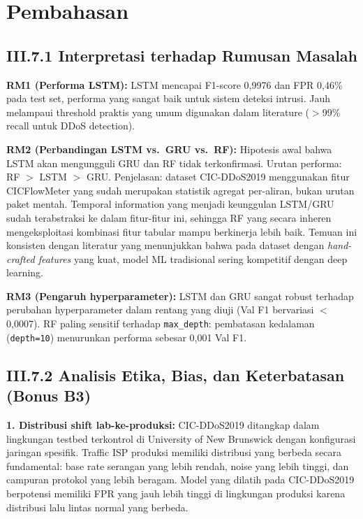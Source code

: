 \documentclass[11pt,a4paper,oneside]{report}
\begin{document}
\section{Pembahasan}

\subsection*{III.7.1 Interpretasi terhadap Rumusan Masalah}

\textbf{RM1 (Performa LSTM):} LSTM mencapai F1-score 0,9976 dan FPR 0,46\% pada test set, performa yang sangat baik untuk sistem deteksi intrusi. Jauh melampaui threshold praktis yang umum digunakan dalam literature ($>$99\% recall untuk DDoS detection).

\textbf{RM2 (Perbandingan LSTM vs.\ GRU vs.\ RF):} Hipotesis awal bahwa LSTM akan mengungguli GRU dan RF tidak terkonfirmasi. Urutan performa: RF $>$ LSTM $>$ GRU. Penjelasan: dataset CIC-DDoS2019 menggunakan fitur CICFlowMeter yang sudah merupakan statistik agregat per-aliran, bukan urutan paket mentah. Temporal information yang menjadi keunggulan LSTM/GRU sudah terabstraksi ke dalam fitur-fitur ini, sehingga RF yang secara inheren mengeksploitasi kombinasi fitur tabular mampu berkinerja lebih baik. Temuan ini konsisten dengan literatur yang menunjukkan bahwa pada dataset dengan \textit{hand-crafted features} yang kuat, model ML tradisional sering kompetitif dengan deep learning.

\textbf{RM3 (Pengaruh hyperparameter):} LSTM dan GRU sangat robust terhadap perubahan hyperparameter dalam rentang yang diuji (Val F1 bervariasi $<$0,0007). RF paling sensitif terhadap \texttt{max\_depth}: pembatasan kedalaman (\texttt{depth=10}) menurunkan performa sebesar 0,001 Val F1.

\subsection*{III.7.2 Analisis Etika, Bias, dan Keterbatasan (Bonus B3)}

\textbf{1. Distribusi shift lab-ke-produksi:} CIC-DDoS2019 ditangkap dalam lingkungan testbed terkontrol di University of New Brunswick dengan konfigurasi jaringan spesifik. Traffic ISP produksi memiliki distribusi yang berbeda secara fundamental: base rate serangan yang lebih rendah, noise yang lebih tinggi, dan campuran protokol yang lebih beragam. Model yang dilatih pada CIC-DDoS2019 berpotensi memiliki FPR yang jauh lebih tinggi di lingkungan produksi karena distribusi lalu lintas normal yang berbeda.
\end{document}
